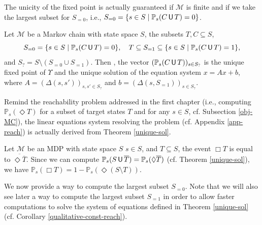 The unicity of the fixed point is actually guaranteed if $\mathcal{M}$ is finite and if we take the largest subset for $S_{=0}$, i.e., $S_{=0}=\{s \in S \; | \; \mathbb{P}_s(C \,\text{\sffamily U}\, T) =0 \}$.

\begin{theorem} \label{unique-sol}
Let $\mathcal{M}$ be a Markov chain with state space $S$, the subsets $T, C \subseteq S$,
\[
  S_{=0} = \{s \in S \; | \; \mathbb{P}_s(C \,\text{\sffamily U}\, T) = 0 \}, \quad
  T \subseteq S_{=1} \subseteq \{s \in S \; | \; \mathbb{P}_s(C \,\text{\sffamily U}\, T) = 1 \},
\]
and $S_? = S \setminus (S_{=0} \cup S_{=1})$. Then , the vector $(\mathbb{P}_s(C \,\text{\sffamily U}\, T))_{s \in S_?}$ is the unique fixed point of $\Upsilon$ and the unique solution of the equation system $x = Ax+b$, where $A = (\Delta(s, s'))_{s, s' \in S_?}$ and $b = (\Delta(s, S_{=1}))_{s \in S_?}$.
\end{theorem}

\begin{remark}
  Remind the reachability problem addressed in the first chapter (i.e., computing $\mathbb{P}_s(\Diamond T)$ for a subset of target states $T$ and for any $s \in S$, cf. Subsection \ref{obj-MC}), the linear equations system resolving the problem (cf. Appendix \ref{app-reach}) is actually derived from Theorem \ref{unique-sol}.
\end{remark}

\begin{remark}
  Let $\mathcal{M}$ be an MDP with state space $S$ $s \in S$, and $T \subseteq S$, the event $\Box T$ is equal to $\overline{\Diamond \overline{T}}$.
  Since we can compute $\mathbb{P}_s(S \,\text{\sffamily U}\, \overline{T}) = \mathbb{P}_s(\Diamond \overline{T})$ (cf. Theorem \ref{unique-sol}), we have $\mathbb{P}_s(\Box T) = 1 - \mathbb{P}_s(\Diamond (S \setminus T))$.
\end{remark}

We now provide a way to compute the largest subset $S_{=0}$. Note that we will also see later a way to compute the largest subset $S_{=1}$ in order to allow faster computations to solve the system of  equations defined in Theorem \ref{unique-sol} (cf. Corollary \ref{qualitative-const-reach}).

